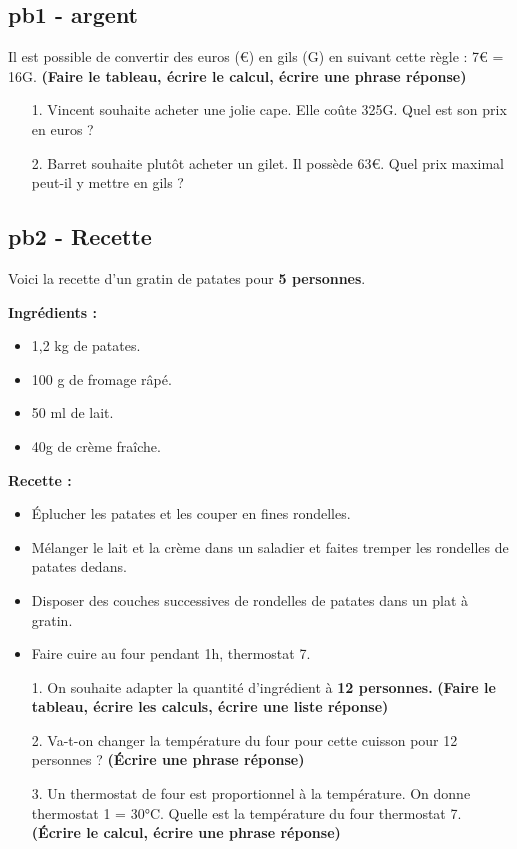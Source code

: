\documentclass[11pt]{article}
\begin{document}
\subsection*{pb1 - argent}
Il est possible de convertir des euros (€) en gils (G) en suivant cette règle : 7€ = 16G.
\textbf{(Faire le tableau, écrire le calcul, écrire une phrase réponse)}

\begin{enumerate}
  \item[1.] Vincent souhaite acheter une jolie cape. Elle coûte 325G. Quel est son prix en euros ? 
  \item[2.] Barret souhaite plutôt acheter un gilet. Il possède 63€. Quel prix maximal peut-il y mettre en gils ?
\end{enumerate}

\subsection*{pb2 - Recette}
Voici la recette d'un gratin de patates pour \textbf{5 personnes}. 

\begin{minipage}[t]{0.45\textwidth}
  \textbf{Ingrédients : }
  \begin{itemize}
    \item 1,2 kg de patates.
    \item 100 g de fromage râpé.
    \item 50 ml de lait.
    \item 40g de crème fraîche.
  \end{itemize}

\end{minipage}
\begin{minipage}[t]{0.5\textwidth}
  \textbf{Recette :}
  \begin{itemize}
    \item Éplucher les patates et les couper en fines rondelles.
    \item Mélanger le lait et la crème dans un saladier et faites tremper les rondelles de patates dedans.
    \item Disposer des couches successives de rondelles de patates dans un plat à gratin. 
    \item Faire cuire au four pendant 1h, thermostat 7.
  \end{itemize}
\end{minipage}

\begin{enumerate}
  \item[1.] On souhaite adapter la quantité d'ingrédient à \textbf{12 personnes.} \textbf{(Faire le tableau, écrire les calculs, écrire une liste réponse)}
  \item[2.] Va-t-on changer la température du four pour cette cuisson pour 12 personnes ?  \textbf{(Écrire une phrase réponse)}
  \item[3.] Un thermostat de four est proportionnel à la température. On donne thermostat 1 = 30°C. Quelle est la température du four thermostat 7. \textbf{(Écrire le calcul, écrire une phrase réponse)} 
\end{enumerate}
\end{document}
